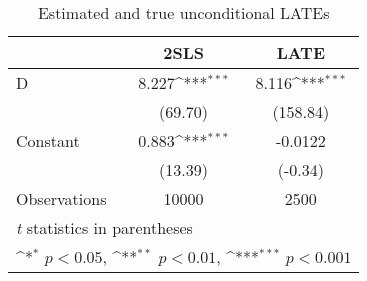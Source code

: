 \begin{table}[htbp]\centering
\def\sym#1{\ifmmode^{#1}\else\(^{#1}\)\fi}
\caption{Estimated and true unconditional LATEs \label{tab:CPunconditional}}
\begin{tabular}{l*{2}{c}}
\toprule
                    &\multicolumn{1}{c}{2SLS}&\multicolumn{1}{c}{LATE}\\
\midrule
D                   &       8.227\sym{***}&       8.116\sym{***}\\
                    &     (69.70)         &    (158.84)         \\
\addlinespace
Constant            &       0.883\sym{***}&     -0.0122         \\
                    &     (13.39)         &     (-0.34)         \\
\midrule
Observations        &       10000         &        2500         \\
\bottomrule
\multicolumn{3}{l}{\footnotesize \textit{t} statistics in parentheses}\\
\multicolumn{3}{l}{\footnotesize \sym{*} \(p<0.05\), \sym{**} \(p<0.01\), \sym{***} \(p<0.001\)}\\
\end{tabular}
\end{table}
